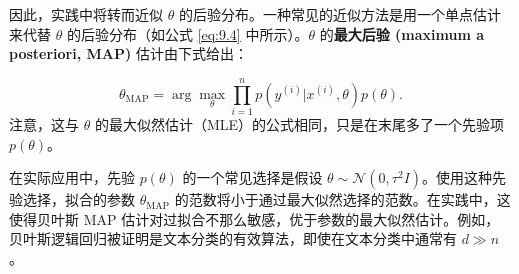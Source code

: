 因此，实践中将转而近似 $\theta$ 的后验分布。一种常见的近似方法是用一个单点估计来代替 $\theta$ 的后验分布（如公式 \eqref{eq:9.4} 中所示）。$\theta$ 的\textbf{最大后验 (maximum a posteriori, MAP)} 估计由下式给出：

\begin{equation}
    \theta_{\text{MAP}} = \arg \max_\theta \prod_{i=1}^n p(y^{(i)} | x^{(i)}, \theta) p(\theta).
    \label{eq:9.5}
\end{equation}
注意，这与 $\theta$ 的最大似然估计（MLE）的公式相同，只是在末尾多了一个先验项 $p(\theta)$。

在实际应用中，先验 $p(\theta)$ 的一个常见选择是假设 $\theta \sim \mathcal{N}(0, \tau^2 I)$。使用这种先验选择，拟合的参数 $\theta_{\text{MAP}}$ 的范数将小于通过最大似然选择的范数。在实践中，这使得贝叶斯 MAP 估计对过拟合不那么敏感，优于参数的最大似然估计。例如，贝叶斯逻辑回归被证明是文本分类的有效算法，即使在文本分类中通常有 $d \gg n$。